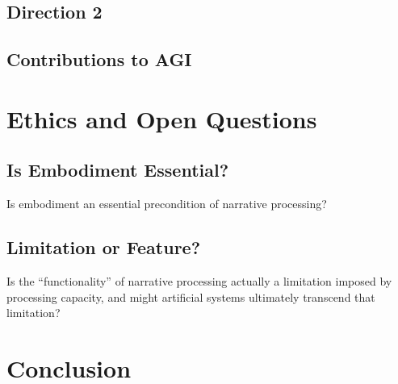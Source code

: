 \documentclass[11pt,a4paper]{article}
\begin{document}

\subsection{Direction 2}


\subsection{Contributions to AGI}


\section{Ethics and Open Questions}
\label{sec:ethics}

\subsection{Is Embodiment Essential?}

Is embodiment an essential precondition of narrative processing?


\subsection{Limitation or Feature?}

Is the ``functionality'' of narrative processing actually a limitation imposed by processing capacity, and might artificial systems ultimately transcend that limitation?


\section{Conclusion}
\label{sec:conclusion}





\end{document}
